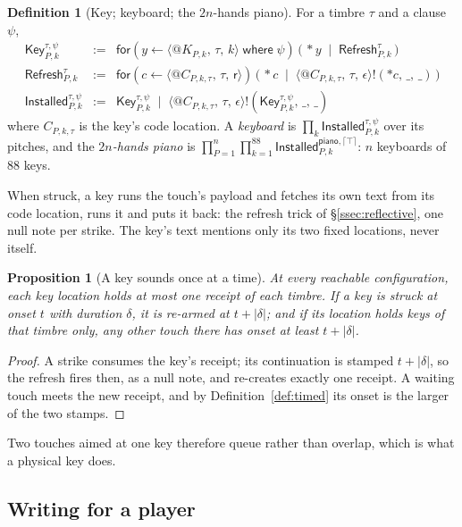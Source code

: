 \documentclass[11pt,a4paper]{article}
\makeatletter
\theoremstyle{plain}
\newtheorem{proposition}[theorem]{Proposition}
\theoremstyle{definition}
\newtheorem{definition}[theorem]{Definition}
\theoremstyle{remark}
\newcommand{\crisp}[1]{\lceil #1 \rceil}
\newcommand{\nm}[3]{\langle @#1,\,#2,\,#3\rangle}
\newcommand{\snd}[4]{#1!(#2,\,#3,\,#4)}
\newcommand{\rcv}[3]{\mathsf{for}(#1 \leftarrow #2)\,#3}
\newcommand{\rcvw}[4]{\mathsf{for}(#1 \leftarrow #2 \;\mathsf{where}\; #3)\,#4}
\newcommand{\len}[1]{|#1|}
\newcommand{\drop}{{*}}
\newcommand{\Refresh}{\mathsf{Refresh}}
\newcommand{\nulld}{\epsilon}
\newcommand{\rest}{\mathsf{r}}
\newcommand{\wild}{\_}
\makeatother
\begin{document}
\begin{definition}[Key; keyboard; the $2n$-hands piano]\label{def:key}
For a timbre $\tau$ and a clause $\psi$,
\[
\begin{array}{rcl}
\mathsf{Key}_{P,k}^{\tau,\psi} &:=&
  \rcvw{y}{\nm{K_{P,k}}{\tau}{k}}{\psi}{\big(\,\drop y \;\mid\; \Refresh_{P,k}^{\tau}\,\big)} \\[5pt]
\Refresh_{P,k}^{\tau} &:=&
  \rcv{c}{\nm{C_{P,k,\tau}}{\tau}{\rest}}{\big(\,\drop c \;\mid\;
    \snd{\nm{C_{P,k,\tau}}{\tau}{\nulld}}{\drop c}{\wild}{\wild}\,\big)} \\[5pt]
\mathsf{Installed}_{P,k}^{\tau,\psi} &:=& \mathsf{Key}_{P,k}^{\tau,\psi} \;\mid\;
  \snd{\nm{C_{P,k,\tau}}{\tau}{\nulld}}{\mathsf{Key}_{P,k}^{\tau,\psi}}{\wild}{\wild}
\end{array}
\]
where $C_{P,k,\tau}$ is the key's code location. A \emph{keyboard} is
$\prod_{k} \mathsf{Installed}_{P,k}^{\tau,\psi}$ over its pitches, and the
\emph{$2n$-hands piano} is $\prod_{P=1}^{n}\prod_{k=1}^{88}
\mathsf{Installed}_{P,k}^{\mathsf{piano},\crisp{\top}}$: $n$ keyboards of
$88$ keys.
\end{definition}

When struck, a key runs the touch's payload and fetches its own text from its
code location, runs it and puts it back: the refresh trick of
\S\ref{ssec:reflective}, one null note per strike. The key's text mentions only
its two fixed locations, never itself.

\begin{proposition}[A key sounds once at a time]\label{prop:keyonce}
At every reachable configuration, each key location holds at most one receipt
of each timbre. If a key is struck at onset $t$ with duration $\delta$, it is
re-armed at $t+\len{\delta}$; and if its location holds keys of that timbre only,
any other touch there has onset at least $t + \len{\delta}$.
\end{proposition}
\begin{proof}
A strike consumes the key's receipt; its continuation is stamped
$t+\len{\delta}$, so the refresh fires then, as a null note, and re-creates exactly
one receipt. A waiting touch meets the new receipt, and by
Definition~\ref{def:timed} its onset is the larger of the two stamps.
\end{proof}

Two touches aimed at one key therefore queue rather than overlap, which is what
a physical key does.

\subsection{Writing for a player}
\end{document}
